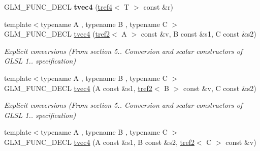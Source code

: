 \begin{DoxyCompactItemize}
\item 
\hypertarget{structglm_1_1detail_1_1tvec4_aac672cccaaf55ba163763d7bde03b956}{}G\+L\+M\+\_\+\+F\+U\+N\+C\+\_\+\+D\+E\+C\+L {\bfseries tvec4} (\hyperlink{structglm_1_1detail_1_1tref4}{tref4}$<$ T $>$ const \&r)\label{structglm_1_1detail_1_1tvec4_aac672cccaaf55ba163763d7bde03b956}

\item 
\hypertarget{structglm_1_1detail_1_1tvec4_a656ca512c584331127e1dc22f8b0b677}{}{\footnotesize template$<$typename A , typename B , typename C $>$ }\\G\+L\+M\+\_\+\+F\+U\+N\+C\+\_\+\+D\+E\+C\+L \hyperlink{structglm_1_1detail_1_1tvec4_a656ca512c584331127e1dc22f8b0b677}{tvec4} (\hyperlink{structglm_1_1detail_1_1tref2}{tref2}$<$ A $>$ const \&v, B const \&s1, C const \&s2)\label{structglm_1_1detail_1_1tvec4_a656ca512c584331127e1dc22f8b0b677}

\begin{DoxyCompactList}\small\item\em Explicit conversions (From section 5.. Conversion and scalar constructors of G\+L\+S\+L 1.. specification) \end{DoxyCompactList}\item 
\hypertarget{structglm_1_1detail_1_1tvec4_af98cd8a1b713ba61bc3b9f3c02732797}{}{\footnotesize template$<$typename A , typename B , typename C $>$ }\\G\+L\+M\+\_\+\+F\+U\+N\+C\+\_\+\+D\+E\+C\+L \hyperlink{structglm_1_1detail_1_1tvec4_af98cd8a1b713ba61bc3b9f3c02732797}{tvec4} (A const \&s1, \hyperlink{structglm_1_1detail_1_1tref2}{tref2}$<$ B $>$ const \&v, C const \&s2)\label{structglm_1_1detail_1_1tvec4_af98cd8a1b713ba61bc3b9f3c02732797}

\begin{DoxyCompactList}\small\item\em Explicit conversions (From section 5.. Conversion and scalar constructors of G\+L\+S\+L 1.. specification) \end{DoxyCompactList}\item 
\hypertarget{structglm_1_1detail_1_1tvec4_abc6cdc6d475e969efb4c0fbbfa045417}{}{\footnotesize template$<$typename A , typename B , typename C $>$ }\\G\+L\+M\+\_\+\+F\+U\+N\+C\+\_\+\+D\+E\+C\+L \hyperlink{structglm_1_1detail_1_1tvec4_abc6cdc6d475e969efb4c0fbbfa045417}{tvec4} (A const \&s1, B const \&s2, \hyperlink{structglm_1_1detail_1_1tref2}{tref2}$<$ C $>$ const \&v)\label{structglm_1_1detail_1_1tvec4_abc6cdc6d475e969efb4c0fbbfa045417}


\end{DoxyCompactItemize}
